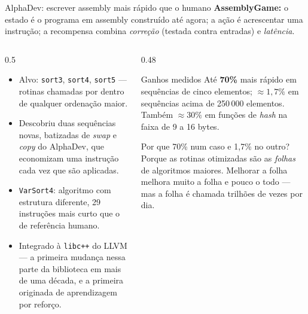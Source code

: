 \documentclass[aspectratio=169, 10pt]{beamer}
\begin{document}
\begin{frame}{AlphaDev: escrever assembly mais rápido que o humano}
  \small
  \textbf{AssemblyGame:} o estado é o programa em assembly construído até agora; a
  ação é acrescentar uma instrução; a recompensa combina \emph{correção} (testada
  contra entradas) e \emph{latência}.

  \begin{columns}[T]
    \begin{column}{0.5\textwidth}
      \begin{itemize}
        \item Alvo: \texttt{sort3}, \texttt{sort4}, \texttt{sort5} --- rotinas
              chamadas por dentro de qualquer ordenação maior.
        \item Descobriu duas sequências novas, batizadas de \emph{swap} e
              \emph{copy} do AlphaDev, que economizam uma instrução cada vez que
              são aplicadas.
        \item \texttt{VarSort4}: algoritmo com estrutura diferente, 29 instruções
              mais curto que o de referência humano.
        \item Integrado à \texttt{libc++} do LLVM --- a primeira mudança nessa
              parte da biblioteca em mais de uma década, e a primeira originada de
              aprendizagem por reforço.
      \end{itemize}
    \end{column}
    \begin{column}{0.48\textwidth}
      \begin{teobox}{Ganhos medidos}
        Até \textbf{70\%} mais rápido em sequências de cinco elementos;
        $\approx 1{,}7\%$ em sequências acima de 250\,000 elementos.
        Também $\approx 30\%$ em funções de \emph{hash} na faixa de 9 a 16 bytes.
      \end{teobox}
      \begin{ideiabox}
        Por que 70\% num caso e 1,7\% no outro? Porque as rotinas otimizadas são
        as \emph{folhas} de algoritmos maiores. Melhorar a folha melhora muito a
        folha e pouco o todo --- mas a folha é chamada trilhões de vezes por dia.
      \end{ideiabox}
    \end{column}
  \end{columns}
\end{frame}
\end{document}
